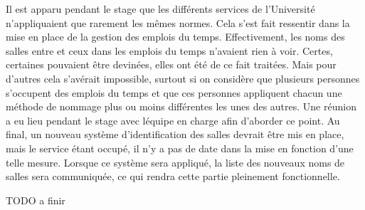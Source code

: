 Il est apparu pendant le stage que les diff\'erents services de l'Universit\'e n'appliquaient que rarement les m\^emes normes.
Cela s'est fait ressentir dans la mise en place de la gestion des emplois du temps.
Effectivement, les noms des salles entre {\YuukouII} et ceux dans les emplois du temps n'avaient rien \`a voir.
Certes, certaines pouvaient \^etre devin\'ees, elles ont \'et\'e de ce fait trait\'ees.
Mais pour d'autres cela s'av\'erait impossible, surtout si on consid\`ere que plusieurs personnes s'occupent des emplois du temps et que ces personnes appliquent chacun une m\'ethode de nommage plus ou moins diff\'erentes les unes des autres.
Une r\'eunion a eu lieu pendant le stage avec l\'equipe en charge afin d'aborder ce point.
Au final, un nouveau syst\`eme d'identification des salles devrait \^etre mis en place, mais le service \'etant occup\'e, il n'y a pas de date dans la mise en fonction d'une telle mesure.
Lorsque ce syst\`eme sera appliqu\'e, la liste des nouveaux noms de salles sera communiqu\'ee, ce qui rendra cette partie pleinement fonctionnelle.

TODO a finir



\clearpage

